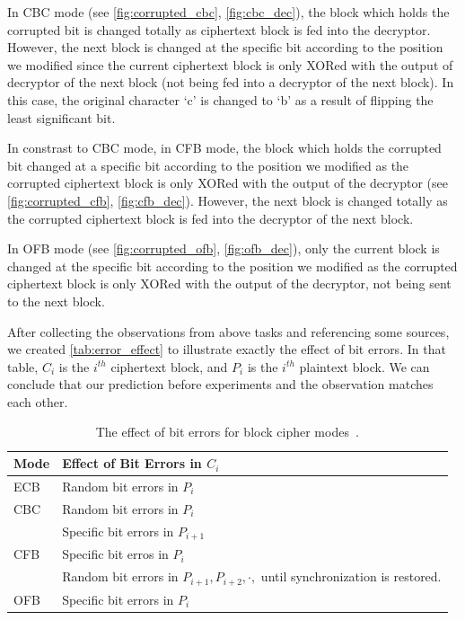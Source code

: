 In CBC mode (see \autoref{fig:corrupted_cbc}, \autoref{fig:cbc_dec}), the block which holds
the corrupted bit
is changed totally as ciphertext block is fed into the decryptor. However, the next block
is changed at the specific bit according to the position we modified since the current ciphertext
block is only XORed with the output of decryptor of the next block (not being fed into
a decryptor of the next block). In this case, the original character `c' is changed to
`b' as a result of flipping the least significant bit.

In constrast to CBC mode, in CFB mode, the block which holds the corrupted bit changed at a specific
bit according to the position we modified as the corrupted ciphertext block is only XORed
with the output of the decryptor (see \autoref{fig:corrupted_cfb}, \autoref{fig:cfb_dec}).
However, the next block is changed totally as the corrupted ciphertext block is fed into
the decryptor of the next block.

In OFB mode (see \autoref{fig:corrupted_ofb}, \autoref{fig:ofb_dec}), only the current block
is changed at the specific bit according to the position we modified as the corrupted ciphertext
block is only XORed with the output of the decryptor, not being sent to the next block.

After collecting the observations from above tasks and referencing some sources, we created
\autoref{tab:error_effect} to illustrate exactly the effect of bit errors. In that table,
\(C_i\) is the \(i^{th}\) ciphertext block, and \(P_i\) is the \(i^{th}\) plaintext block.
We can conclude that our prediction before experiments and the observation matches each
other.

\begin{table}
    \centering
    \begin{tabular}{|l|l|}
        \hline
        Mode & Effect of Bit Errors in \(C_i\)\\
        \hline
        ECB & Random bit errors in \(P_i\)\\
        \hline
        CBC & Random bit errors in \(P_i\)\\
         & Specific bit errors in \(P_{i+1}\)\\
        \hline
        CFB & Specific bit erros in \(P_i\)\\
         & Random bit errors in \(P_{i+1},P_{i+2},\cdot,\) until synchronization is restored.\\
        \hline
        OFB & Specific bit errors in \(P_i\)\\
        \hline
    \end{tabular}
    \caption{The effect of bit errors for block cipher modes~\cite{cipher_mode_wiki,error_prop}.}
    \label{tab:error_effect}
\end{table}

